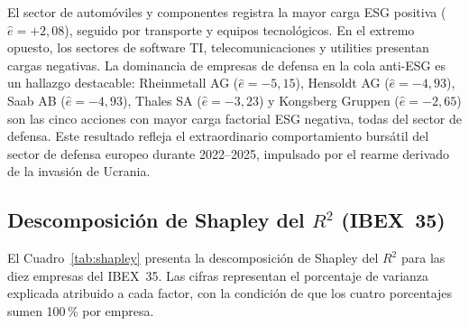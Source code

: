 \documentclass[12pt, a4paper]{article}
\begin{document}
El sector de autom\'oviles y componentes registra la mayor carga ESG positiva
($\hat{e}=+2{,}08$), seguido por transporte y equipos tecnol\'ogicos. En el extremo
opuesto, los sectores de software TI, telecomunicaciones y utilities presentan cargas
negativas. La dominancia de empresas de defensa en la cola anti-ESG es un hallazgo
destacable: Rheinmetall AG ($\hat{e}=-5{,}15$), Hensoldt AG ($\hat{e}=-4{,}93$),
Saab AB ($\hat{e}=-4{,}93$), Thales SA ($\hat{e}=-3{,}23$) y Kongsberg Gruppen
($\hat{e}=-2{,}65$) son las cinco acciones con mayor carga factorial ESG negativa,
todas del sector de defensa. Este resultado refleja el extraordinario comportamiento
burs\'atil del sector de defensa europeo durante 2022--2025, impulsado por el rearme
derivado de la invasi\'on de Ucrania.

\subsection{Descomposici\'on de Shapley del $R^2$ (IBEX~35)}
\label{subsec:shapley_res}

El Cuadro~\ref{tab:shapley} presenta la descomposici\'on de Shapley del $R^2$ para
las diez empresas del IBEX~35. Las cifras representan el porcentaje de varianza
explicada atribuido a cada factor, con la condici\'on de que los cuatro porcentajes
sumen 100\,\% por empresa.
\end{document}
